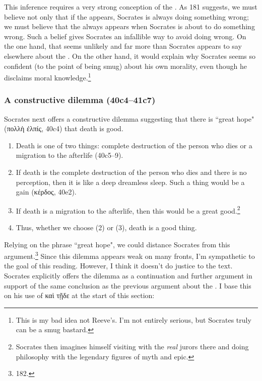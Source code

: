 \documentclass[11pt]{article}
\begin{document}
This inference requires a very strong conception of the
.  As \citet{reeve1989} 181 suggests, we must believe
not only that if the  appears, Socrates is always doing
something wrong; we must believe that the  always
appears when Socrates is about to do something wrong.  Such a belief gives
Socrates an infallible way to avoid doing wrong.  On the one hand, that
seems unlikely and far more than Socrates appears to say elsewhere about
the .  On the other hand, it would explain why Socrates
seems so confident (to the point of being smug) about his own morality,
even though he disclaims moral knowledge.\footnote{This is my bad idea not
Reeve's.  I'm not entirely serious, but Socrates truly can be a smug
bastard.}


\subsubsection{A constructive dilemma (40c4--41c7)}

Socrates next offers a constructive dilemma suggesting that there is
``great hope" ({\g πολλὴ ἐλπίς}, 40c4) that death is good.

\begin{enumerate}

    \item Death is one of two things: complete destruction of the person
        who dies or a migration to the afterlife (40c5--9).

    \item If death is the complete destruction of the person who dies and
        there is no perception, then it is like a deep dreamless sleep.
        Such a thing would be a gain ({\g κέρδος}, 40e2).

    \item If death is a migration to the afterlife, then this would be
        a great good.\footnote{Socrates then imagines himself visiting with
        the \emph{real} jurors there and doing philosophy with the
        legendary figures of myth and epic.}

    \item Thus, whether we choose (2) or (3), death is a good thing.

\end{enumerate}

Relying on the phrase ``great hope", we could distance Socrates from this
argument.\footnote{\citet{reeve1989} 182.}  Since this dilemma appears weak
on many fronts, I'm sympathetic to the goal of this reading.  However,
I think it doesn't do justice to the text.  Socrates explicitly offers the
dilemma as a continuation and further argument in support of the same
conclusion as the previous argument about the .  I base
this on his use of {\g καὶ τῇδε} at the start of this section:
\end{document}
